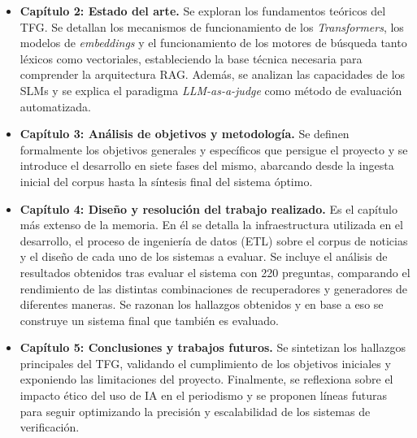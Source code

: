 \begin{itemize}
    \item \textbf{Capítulo 2: Estado del arte.} Se exploran los fundamentos teóricos del TFG. Se detallan los mecanismos de funcionamiento de los \textit{Transformers}, los modelos de \textit{embeddings} y el funcionamiento de los motores de búsqueda tanto léxicos como vectoriales, estableciendo la base técnica necesaria para comprender la arquitectura RAG. Además, se analizan las capacidades de los SLMs y se explica el paradigma \textit{LLM-as-a-judge} como método de evaluación automatizada.
    
    \item \textbf{Capítulo 3: Análisis de objetivos y metodología.} Se definen formalmente los objetivos generales y específicos que persigue el proyecto y se introduce el desarrollo en siete fases del mismo, abarcando desde la ingesta inicial del corpus hasta la síntesis final del sistema óptimo.
    
    \item \textbf{Capítulo 4: Diseño y resolución del trabajo realizado.} Es el capítulo más extenso de la memoria. En él se detalla la infraestructura utilizada en el desarrollo, el proceso de ingeniería de datos (ETL) sobre el corpus de noticias y el diseño de cada uno de los sistemas a evaluar. Se incluye el análisis de resultados obtenidos tras evaluar el sistema con 220 preguntas, comparando el rendimiento de las distintas combinaciones de recuperadores y generadores de diferentes maneras. Se razonan los hallazgos obtenidos y en base a eso se construye un sistema final que también es evaluado.
    
    \item \textbf{Capítulo 5: Conclusiones y trabajos futuros.} Se sintetizan los hallazgos principales del TFG, validando el cumplimiento de los objetivos iniciales y exponiendo las limitaciones del proyecto. Finalmente, se reflexiona sobre el impacto ético del uso de IA en el periodismo y se proponen líneas futuras para seguir optimizando la precisión y escalabilidad de los sistemas de verificación.
\end{itemize}